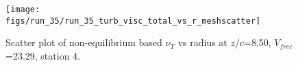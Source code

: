 \begin{figure}[H]
\centering
\texttt{[image: figs/run\_35/run\_35\_turb\_visc\_total\_vs\_r\_meshscatter]}
\caption{Scatter plot of non-equilibrium based $\nu_T$ vs radius at $z/c$=8.50, $V_{free}$=23.29, station 4.}
\label{fig:run_35_turb_visc_total_vs_r_meshscatter}
\end{figure}


